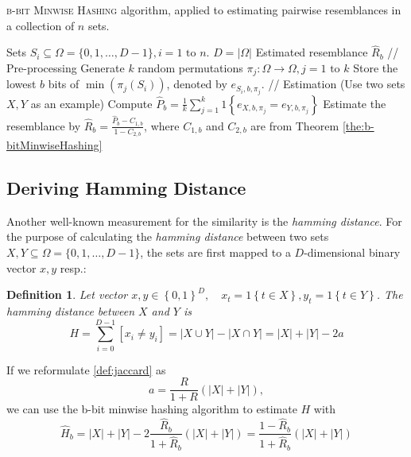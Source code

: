 \documentclass[a4paper]{article}
\newtheorem{mydef}{Definition}
\begin{document}
\begin{algorithm}[H]
\caption{\textsc{b-bit Minwise Hashing} algorithm, applied to estimating pairwise resemblances in a collection of $n$ sets.}
\label{alg:minwiseHashing}
\begin{algorithmic}
\Require Sets $S_i \subseteq \Omega = \{0,1,\ldots,D-1\}, i = 1 \text{ to } n$. \Comment $D = \left| \Omega \right|$
\Ensure Estimated resemblance $\hat{R}_b$
\State // Pre-processing
\State Generate $k$ random permutations $\pi_j: \Omega\longrightarrow\Omega, j=1\text{ to }k$
	\State Store the lowest $b$ bits of $\min(\pi_j(S_i))$, denoted by $e_{S_i,b,\pi_j}$.
\EndFor
\State
\State // Estimation (Use two sets $X,Y$ as an example)
\State Compute $\hat{P}_b = \frac{1}{k}\sum_{j=1}^k 1 \left\lbrace  e_{X,b,\pi_j } = e_{Y,b,\pi_j } \right\rbrace$
\State Estimate the resemblance by $\hat{R}_b = \frac{\hat{P}_b-C_{1,b}}{1-C_{2,b}}$, where $C_{1,b}$ and $C_{2,b}$ are from Theorem \vref{the:b-bitMinwiseHashing}
\end{algorithmic}
\end{algorithm}


\subsection{Deriving Hamming Distance}

Another well-known measurement for the similarity is the \emph{hamming distance}. For the purpose of calculating the \emph{hamming distance} between two sets $X,Y \subseteq \Omega = \{0,1,\ldots,D-1\}$, the sets are first mapped to a $D$-dimensional binary vector $x,y$ resp.:
\begin{framed}
\begin{mydef}\label{def:hamming}
Let vector $x,y \in \left\lbrace 0,1 \right\rbrace ^D, \quad x_t = 1\left\lbrace t \in X \right\rbrace, y_t = 1\left\lbrace t \in Y \right\rbrace$. The \emph{hamming distance} between $X$ and $Y$ is
\begin{equation}
H=\sum_{i=0}^{D-1}\left[ x_i \neq y_i \right]=|X \cup Y|-|X\cap Y|=|X|+|Y|-2a
\end{equation}
\end{mydef}
\end{framed}

If we reformulate \vref{def:jaccard} as
\begin{equation}
a=\frac{R}{1+R}(|X|+|Y|),
\end{equation}
we can use the b-bit minwise hashing algorithm to estimate $H$ with
\begin{equation}
\hat{H}_b=|X|+|Y|-2\frac{\hat{R}_b}{1+\hat{R}_b}(|X|+|Y|)=\frac{1-\hat{R}_b}{1+\hat{R}_b}(|X|+|Y|)
\end{equation}
\end{document}
